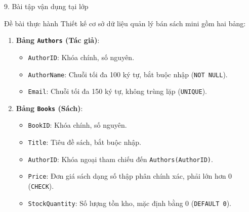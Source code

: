 \documentclass[aspectratio=169,11pt]{beamer}
\begin{document}
\begin{frame}{9. Bài tập vận dụng tại lớp}
\begin{block}{Đề bài thực hành}
  Thiết kế cơ sở dữ liệu quản lý bán sách mini gồm hai bảng:
  \begin{enumerate}\setlength{\itemsep}{2pt}
    \item \textbf{Bảng \texttt{Authors} (Tác giả)}:
      \begin{itemize}\setlength{\itemsep}{1pt}
        \item \texttt{AuthorID}: Khóa chính, số nguyên.
        \item \texttt{AuthorName}: Chuỗi tối đa 100 ký tự, bắt buộc nhập (\texttt{NOT NULL}).
        \item \texttt{Email}: Chuỗi tối đa 150 ký tự, không trùng lặp (\texttt{UNIQUE}).
      \end{itemize}
    \item \textbf{Bảng \texttt{Books} (Sách)}:
      \begin{itemize}\setlength{\itemsep}{1pt}
        \item \texttt{BookID}: Khóa chính, số nguyên.
        \item \texttt{Title}: Tiêu đề sách, bắt buộc nhập.
        \item \texttt{AuthorID}: Khóa ngoại tham chiếu đến \texttt{Authors(AuthorID)}.
        \item \texttt{Price}: Đơn giá sách dạng số thập phân chính xác, phải lớn hơn 0 (\texttt{CHECK}).
        \item \texttt{StockQuantity}: Số lượng tồn kho, mặc định bằng 0 (\texttt{DEFAULT 0}).
      \end{itemize}
  \end{enumerate}
\end{block}
\end{frame}
\end{document}
